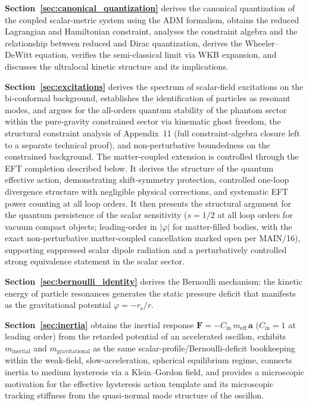 \documentclass[aps,prd,onecolumn,superscriptaddress,nofootinbib,showpacs,12pt,notitlepage]{revtex4-2}
\newcommand{\rs}{r_{\mathrm{s}}}
\newcommand{\meff}{m_{\mathrm{eff}}}
\begin{document}
\textbf{Section~\ref{sec:canonical_quantization}} derives the
canonical quantization of the coupled scalar-metric system using
the ADM formalism, obtains the reduced Lagrangian and Hamiltonian
constraint, analyses the constraint algebra and the relationship
between reduced and Dirac quantization, derives the Wheeler--DeWitt
equation, verifies the semi-classical limit via WKB expansion, and
discusses the ultralocal kinetic structure and its implications.

\textbf{Section~\ref{sec:excitations}} derives the spectrum of
scalar-field excitations on the bi-conformal background,
establishes the identification of particles as resonant modes,
and argues for the all-orders quantum stability of the phantom
sector within the pure-gravity constrained sector via
kinematic ghost freedom, the structural constraint analysis
of Appendix~11 (full constraint-algebra closure left to a
separate technical proof), and non-perturbative boundedness
on the constrained background. The matter-coupled extension is
controlled through the EFT completion described below.  It derives the
structure of the quantum effective action, demonstrating
shift-symmetry protection, controlled one-loop divergence
structure with negligible physical corrections, and
systematic EFT power counting at all loop orders.  It then
presents the structural argument for the quantum persistence
of the scalar sensitivity ($s = 1/2$ at all loop orders for
vacuum compact objects; leading-order in $|\varphi|$ for
matter-filled bodies, with the exact non-perturbative
matter-coupled cancellation marked open per MAIN/16),
supporting suppressed scalar dipole radiation and a
perturbatively controlled strong equivalence statement in the
scalar sector.

\textbf{Section~\ref{sec:bernoulli_identity}} derives the Bernoulli mechanism:
the kinetic energy of particle resonances generates the static pressure
deficit that manifests as the gravitational potential
$\varphi = -\rs/r$.

\textbf{Section~\ref{sec:inertia}} obtains the inertial response
$\mathbf{F} = -C_{\mathrm{in}}\,\meff\,\mathbf{a}$
($C_{\mathrm{in}}=1$ at leading order) from the retarded
potential of an accelerated oscillon, exhibits
$m_{\mathrm{inertial}}$ and $m_{\mathrm{gravitational}}$
as the same scalar-profile/Bernoulli-deficit bookkeeping
within the weak-field, slow-acceleration, spherical
equilibrium regime, connects inertia to medium hysteresis
via a Klein--Gordon field, and provides a microscopic motivation
for the effective hysteresis action template and its microscopic
tracking stiffness from the quasi-normal mode structure of the
oscillon.
\end{document}
